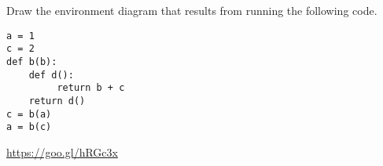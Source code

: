 \begin{blocksection}
\question Draw the environment diagram that results from running the following code.

\begin{lstlisting}
a = 1
c = 2
def b(b):
    def d():
         return b + c
    return d()
c = b(a)
a = b(c)
\end{lstlisting}

\begin{solution}[2in]
\url{https://goo.gl/hRGc3x}
\end{solution}
\end{blocksection}
